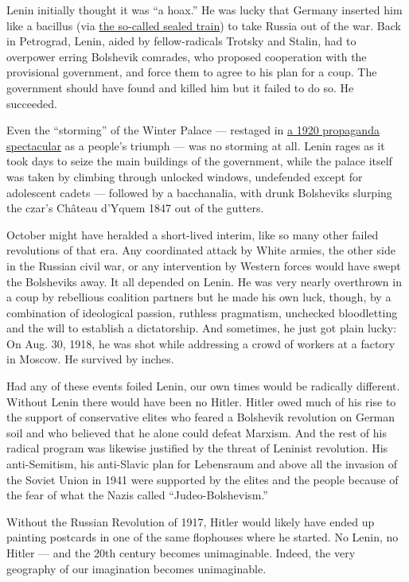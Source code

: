 Lenin initially thought it was ``a hoax.'' He was lucky that Germany
inserted him like a bacillus (via
\href{https://www.nytimes.com/2017/06/19/opinion/was-lenin-a-german-agent.html}{the
so-called sealed train}) to take Russia out of the war. Back in
Petrograd, Lenin, aided by fellow-radicals Trotsky and Stalin, had to
overpower erring Bolshevik comrades, who proposed cooperation with the
provisional government, and force them to agree to his plan for a coup.
The government should have found and killed him but it failed to do so.
He succeeded.

Even the ``storming'' of the Winter Palace --- restaged in
\href{https://www.youtube.com/watch?v=fLihunxEzwE}{a 1920 propaganda
spectacular} as a people's triumph --- was no storming at all. Lenin
rages as it took days to seize the main buildings of the government,
while the palace itself was taken by climbing through unlocked windows,
undefended except for adolescent cadets --- followed by a bacchanalia,
with drunk Bolsheviks slurping the czar's Château d'Yquem 1847 out of
the gutters.

October might have heralded a short-lived interim, like so many other
failed revolutions of that era. Any coordinated attack by White armies,
the other side in the Russian civil war, or any intervention by Western
forces would have swept the Bolsheviks away. It all depended on Lenin.
He was very nearly overthrown in a coup by rebellious coalition partners
but he made his own luck, though, by a combination of ideological
passion, ruthless pragmatism, unchecked bloodletting and the will to
establish a dictatorship. And sometimes, he just got plain lucky: On
Aug. 30, 1918, he was shot while addressing a crowd of workers at a
factory in Moscow. He survived by inches.

Had any of these events foiled Lenin, our own times would be radically
different. Without Lenin there would have been no Hitler. Hitler owed
much of his rise to the support of conservative elites who feared a
Bolshevik revolution on German soil and who believed that he alone could
defeat Marxism. And the rest of his radical program was likewise
justified by the threat of Leninist revolution. His anti-Semitism, his
anti-Slavic plan for Lebensraum and above all the invasion of the Soviet
Union in 1941 were supported by the elites and the people because of the
fear of what the Nazis called ``Judeo-Bolshevism.''

Without the Russian Revolution of 1917, Hitler would likely have ended
up painting postcards in one of the same flophouses where he started. No
Lenin, no Hitler --- and the 20th century becomes unimaginable. Indeed,
the very geography of our imagination becomes unimaginable.

